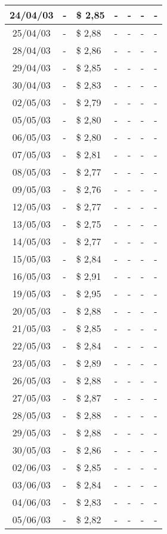 \begin{center}
\begin{longtable}{|c|p{1.5cm}|p{1.5cm}|p{1.5cm}|p{1.5cm}|p{1.5cm}|p{1.5cm}|}
24/04/03 & - & \$ 2,85 & - & - & - & - \\ \hline
25/04/03 & - & \$ 2,88 & - & - & - & - \\ \hline
28/04/03 & - & \$ 2,86 & - & - & - & - \\ \hline
29/04/03 & - & \$ 2,85 & - & - & - & - \\ \hline
30/04/03 & - & \$ 2,83 & - & - & - & - \\ \hline
02/05/03 & - & \$ 2,79 & - & - & - & - \\ \hline
05/05/03 & - & \$ 2,80 & - & - & - & - \\ \hline
06/05/03 & - & \$ 2,80 & - & - & - & - \\ \hline
07/05/03 & - & \$ 2,81 & - & - & - & - \\ \hline
08/05/03 & - & \$ 2,77 & - & - & - & - \\ \hline
09/05/03 & - & \$ 2,76 & - & - & - & - \\ \hline
12/05/03 & - & \$ 2,77 & - & - & - & - \\ \hline
13/05/03 & - & \$ 2,75 & - & - & - & - \\ \hline
14/05/03 & - & \$ 2,77 & - & - & - & - \\ \hline
15/05/03 & - & \$ 2,84 & - & - & - & - \\ \hline
16/05/03 & - & \$ 2,91 & - & - & - & - \\ \hline
19/05/03 & - & \$ 2,95 & - & - & - & - \\ \hline
20/05/03 & - & \$ 2,88 & - & - & - & - \\ \hline
21/05/03 & - & \$ 2,85 & - & - & - & - \\ \hline
22/05/03 & - & \$ 2,84 & - & - & - & - \\ \hline
23/05/03 & - & \$ 2,89 & - & - & - & - \\ \hline
26/05/03 & - & \$ 2,88 & - & - & - & - \\ \hline
27/05/03 & - & \$ 2,87 & - & - & - & - \\ \hline
28/05/03 & - & \$ 2,88 & - & - & - & - \\ \hline
29/05/03 & - & \$ 2,88 & - & - & - & - \\ \hline
30/05/03 & - & \$ 2,86 & - & - & - & - \\ \hline
02/06/03 & - & \$ 2,85 & - & - & - & - \\ \hline
03/06/03 & - & \$ 2,84 & - & - & - & - \\ \hline
04/06/03 & - & \$ 2,83 & - & - & - & - \\ \hline
05/06/03 & - & \$ 2,82 & - & - & - & - \\ \hline

\end{longtable}
\end{center}
